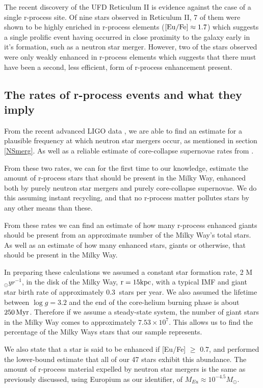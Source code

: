 \documentclass[a4paper,fleqn,usenatbib]{mnras}
\begin{document}
	The recent discovery of the UFD Reticulum II \citep{Ji2016} is evidence against the case of a single r-process site. Of nine stars observed in Reticulum II, 7 of them were shown to be highly enriched in r-process elements ($\rm{[Eu/Fe]\approx1.7}$) which suggests a single prolific event having occurred in close proximity to the galaxy early in it's formation, such as a neutron star merger. However, two of the stars observed were only weakly enhanced in r-process elements which suggests that there must have been a second, less efficient, form of r-process enhancement present.
	
	\subsection{The rates of r-process events and what they imply}
	\label{rates}
	From the recent advanced LIGO data \citep{LIGO2016}, we are able to find an estimate for a plausible frequency at which neutron star mergers occur, as mentioned in section \ref{NSmerg}. As well as a reliable estimate of core-collapse supernovae rates from \citet{Li2011}.
	
	From these two rates, we can for the first time to our knowledge, estimate the amount of r-process stars that should be present in the Milky Way, enhanced both by purely neutron star mergers and purely core-collapse supernovae. We do this assuming instant recycling, and that no r-process matter pollutes stars by any other means than these.
	
	From these rates we can find an estimate of how many r-process enhanced giants should be present from an approximate number of the Milky Way's total stars. As well as an estimate of how many enhanced stars, giants or otherwise, that should be present in the Milky Way.
	
	In preparing these calculations we assumed a constant star formation rate, 2 M$_\odot yr^{-1}$, in the disk of the Milky Way, $\rm{r=15kpc}$, with a typical IMF and giant star birth rate of approximately $0.3\ $ stars per year. We also assumed the lifetime between $\log{g} = 3.2$ and the end of the core-helium burning phase is about $250\,{\rm Myr}$. Therefore if we assume a steady-state system, the number of giant stars in the Milky Way comes to approximately $7.53\times10^7$. This allows us to find the percentage of the Milky Ways stars that our sample represents.
	
	We also state that a star is said to be enhanced if [Eu/Fe] $\geq$ 0.7, and performed the lower-bound estimate that all of our 47 stars exhibit this abundance. The amount of r-process material expelled by neutron star mergers is the same as previously discussed, using Europium as our identifier, of $M_{Eu}\approx10^{-4.5} M_{\odot}$.
	
\end{document}
